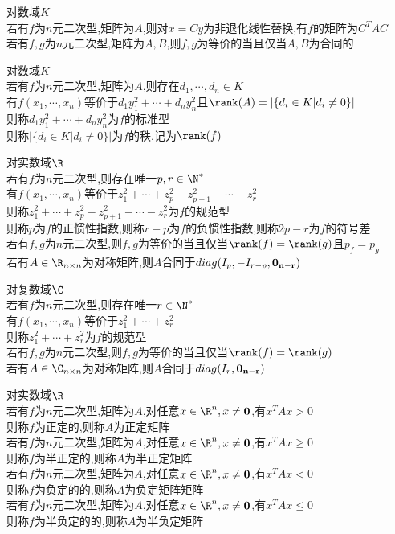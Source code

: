 \begin{dingli}
对数域$K$\\
若有$f$为$n$元二次型,矩阵为$A$,则对$x=Cy$为非退化线性替换,\mbox{有$f$的矩阵为$C^{T}AC$}\\
若有$f,g$为$n$元二次型,矩阵为$A,B$,则$f,g$为等价的当且仅当$A,B$为合同的
\end{dingli}

\begin{dingli}
对数域$K$\\
若有$f$为$n$元二次型,矩阵为$A$,则存在$d_1,\cdots,d_n\in K$\\
有$f(x_1,\cdots,x_n)$等价于$d_1y_1^2+\cdots+d_ny_n^2$且$\rank(A)=|\{d_i\in K|d_i\neq 0\}|$\\
则称$d_1y_1^2+\cdots+d_ny_n^2$为$f$的标准型\\
则称$|\{d_i\in K|d_i\neq 0\}|$为$f$的秩,记为$\rank(f)$
\end{dingli}

\begin{dingli}
对实数域$\R$\\
若有$f$为$n$元二次型,则存在唯一$p,r\in\N^*$\\
有$f(x_1,\cdots,x_n)$等价于$z_1^2+\cdots+z_p^2-z_{p+1}^2-\cdots-z_r^2$\\
则称$z_1^2+\cdots+z_p^2-z_{p+1}^2-\cdots-z_r^2$为$f$的规范型\\
则称$p$为$f$的正惯性指数,则称$r-p$为$f$的负惯性指数,则称$2p-r$为$f$的符号差\\
若有$f,g$为$n$元二次型,则$f,g$为等价的当且仅当$\rank(f)=\rank(g)$且$p_{f}=p_{g}$\\
若有$A\in \R_{n\times n}$为对称矩阵,则$A$合同于$diag(I_p,-I_{r-p},{\bf0_{n-r}})$
\end{dingli}

\begin{dingli}
对复数域$\C$\\
若有$f$为$n$元二次型,则存在唯一$r\in\N^*$\\
有$f(x_1,\cdots,x_n)$等价于$z_1^2+\cdots+z_r^2$\\
则称$z_1^2+\cdots+z_r^2$为$f$的规范型\\
若有$f,g$为$n$元二次型,则$f,g$为等价的当且仅当$\rank(f)=\rank(g)$\\
若有$A\in \C_{n\times n}$为对称矩阵,则$A$合同于$diag(I_r,{\bf0_{n-r}})$
\end{dingli}

\begin{dingyi}
对实数域$\R$\\
若有$f$为$n$元二次型,矩阵为$A$,对任意$x\in\R^n,x\neq{\bf0}$,有$x^{T}Ax>0$\\
则称$f$为正定的,则称$A$为正定矩阵\\
若有$f$为$n$元二次型,矩阵为$A$,对任意$x\in\R^n,x\neq{\bf0}$,有$x^{T}Ax\geq0$\\
则称$f$为半正定的,则称$A$为半正定矩阵\\
若有$f$为$n$元二次型,矩阵为$A$,对任意$x\in\R^n,x\neq{\bf0}$,有$x^{T}Ax<0$\\
则称$f$为负定的的,则称$A$为负定矩阵矩阵\\
若有$f$为$n$元二次型,矩阵为$A$,对任意$x\in\R^n,x\neq{\bf0}$,有$x^{T}Ax\leq0$\\
则称$f$为半负定的的,则称$A$为半负定矩阵
\end{dingyi}

